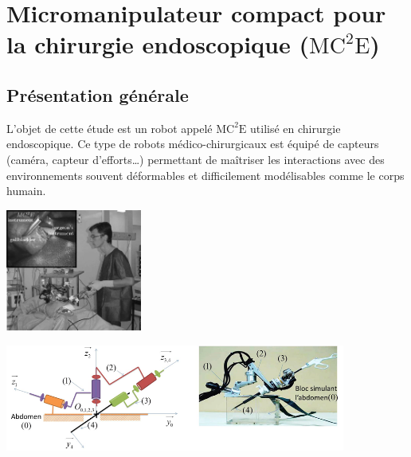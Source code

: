 \documentclass[10pt,fleqn]{article} %
\begin{document}

\vspace{7cm}
\pagestyle{fancy}
\thispagestyle{plain}

\def\columnseprulecolor{\color{ocre}}
\setlength{\columnseprule}{0.4pt} 


\section{Micromanipulateur compact pour la chirurgie endoscopique ($\text{MC}^2\text{E}$)}
\subsection{Présentation générale}
L’objet de cette étude est un robot appelé $\text{MC}^2\text{E}$ utilisé en chirurgie endoscopique. Ce type de
robots médico-chirurgicaux est équipé de capteurs (caméra, capteur d’efforts…) permettant de maîtriser
les interactions avec des environnements souvent déformables et difficilement modélisables comme le
corps humain.

\begin{center}
\begin{minipage}[c]{.1\linewidth}
\begin{center}
\includegraphics[height=4cm]{images/fig_01}
\end{center}
\end{minipage} \hfill
\begin{minipage}[c]{.65\linewidth}
\begin{center}
\includegraphics[height=3.5cm]{images/fig_02}
\end{center}
\end{minipage}
\end{center}
\end{document}
